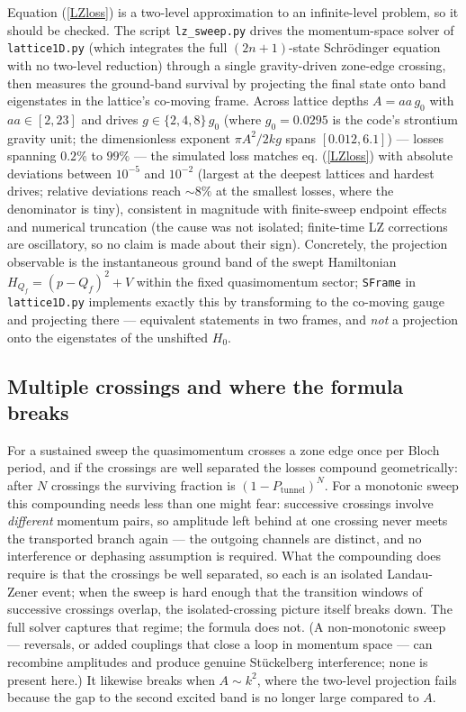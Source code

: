 Equation (\ref{LZloss}) is a two-level approximation to an infinite-level
problem, so it should be checked.  The script \texttt{lz\_sweep.py} drives the
momentum-space solver of \texttt{lattice1D.py} (which integrates the full
$(2n+1)$-state Schr\"odinger equation with no two-level reduction) through a
single gravity-driven zone-edge crossing, then measures the ground-band
survival by projecting the final state onto band eigenstates in the
lattice's co-moving frame.  Across
lattice depths $A = aa\,g_0$ with $aa \in [2, 23]$ and drives
$g \in \{2, 4, 8\}\,g_0$ (where $g_0 = 0.0295$ is the code's strontium
gravity unit; the dimensionless exponent $\pi A^2/2kg$ spans
$[0.012, 6.1]$) --- losses spanning $0.2\%$ to $99\%$ --- the
simulated loss matches eq. (\ref{LZloss}) with absolute deviations between
$10^{-5}$ and $10^{-2}$ (largest at the deepest lattices and hardest drives;
relative deviations reach $\sim 8\%$ at the smallest losses, where the
denominator is tiny), consistent in magnitude with
finite-sweep endpoint effects and numerical truncation (the cause was not
isolated; finite-time LZ corrections are oscillatory, so no claim is made
about their sign).  Concretely, the projection observable is the instantaneous ground band of
the swept Hamiltonian $H_{Q_f} = (p-Q_f)^2 + V$ within the fixed
quasimomentum sector; \texttt{SFrame} in \texttt{lattice1D.py} implements
exactly this by transforming to the co-moving gauge and projecting there ---
equivalent statements in two frames, and \emph{not} a projection onto the
eigenstates of the unshifted $H_0$.

\subsection{Multiple crossings and where the formula breaks}

For a sustained sweep the quasimomentum crosses a zone edge once per Bloch
period, and if the crossings are well separated the losses compound
geometrically: after $N$ crossings the surviving fraction is
$\left(1 - P_{\text{tunnel}}\right)^N$.  For a monotonic sweep this
compounding needs less than one might fear: successive crossings involve
\emph{different} momentum pairs, so amplitude left behind at one crossing
never meets the transported branch again --- the outgoing channels are
distinct, and no interference or dephasing assumption is required.  What the
compounding does require is that the crossings be well separated, so each is
an isolated Landau-Zener event; when the sweep is hard enough that the
transition windows of successive crossings overlap, the isolated-crossing
picture itself breaks down.  The full solver captures that regime; the
formula does not.  (A non-monotonic sweep --- reversals, or added couplings
that close a loop in momentum space --- can recombine amplitudes and produce
genuine St\"uckelberg interference; none is present here.)  It likewise breaks when $A \sim k^2$, where the two-level
projection fails because the gap to the second excited band is no longer
large compared to $A$.

